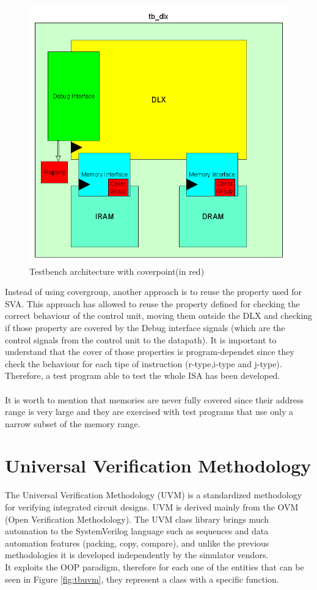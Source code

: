 \begin{figure}[!htbp]
\centering
\captionsetup{justification=centering}
\includegraphics[scale=0.35,angle=0]{./chapters/figures/tb_dlx_cg.png}
\caption{Testbench architecture with coverpoint(in red)}
\label{fig:dlxtbcp}
\end{figure}

Instead of using covergroup, another approach is to reuse the property used for SVA. This approach has allowed to reuse the property defined for checking the correct behaviour of the control unit, moving them outside the DLX and checking if those property are covered by the Debug interface signals (which are the control signals from the control unit to the datapath). It is important to understand that the cover of those properties is program-dependet since they check the behaviour for each tipe of instruction (r-type,i-type and j-type). Therefore, a test program able to test the whole ISA has been developed.\\\\
It is worth to mention that memories are never fully covered since their address range is very large and they are exercised with test programs that use only a narrow subset of the memory range.

\newpage
\section{Universal Verification Methodology}
The Universal Verification Methodology (UVM) is a standardized methodology for verifying integrated circuit designs\cite{paper:3}. UVM is derived mainly from the OVM (Open Verification Methodology). The UVM class library brings much automation to the SystemVerilog language such as sequences and data automation features (packing, copy, compare), and unlike the previous methodologies it is developed independently by the simulator vendors.\\ 
It exploits the OOP paradigm, therefore for each one of the entities that can be seen in Figure \ref{fig:tbuvm}, they represent a class with a specific function.

